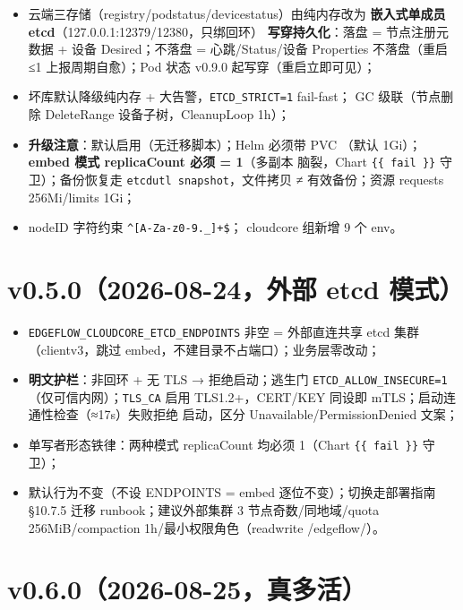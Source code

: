 \begin{itemize}
  \item 云端三存储（registry/podstatus/devicestatus）由纯内存改为
        \textbf{嵌入式单成员 etcd}（127.0.0.1:12379/12380，只绑回环）
        \textbf{写穿持久化}：落盘 = 节点注册元数据 + 设备 Desired；不落盘 =
        心跳/Status/设备 Properties 不落盘（重启 ≤1 上报周期自愈）；Pod 状态 v0.9.0 起写穿（重启立即可见）；
  \item 坏库默认降级纯内存 + 大告警，\texttt{ETCD\_STRICT=1} fail-fast；
        GC 级联（节点删除 DeleteRange 设备子树，CleanupLoop 1h）；
  \item \textbf{升级注意}：默认启用（无迁移脚本）；Helm 必须带 PVC
        （默认 1Gi）；\textbf{embed 模式 replicaCount 必须 = 1}（多副本
        脑裂，Chart \texttt{\{\{ fail \}\}} 守卫）；备份恢复走
        \texttt{etcdutl snapshot}，文件拷贝 ≠ 有效备份；资源 requests
        256Mi/limits 1Gi；
  \item nodeID 字符约束 \texttt{\textasciicircum{}[A-Za-z0-9.\_\-]+\$}；
        cloudcore 组新增 9 个 env。
\end{itemize}

\section{v0.5.0（2026-08-24，外部 etcd 模式）}

\begin{itemize}
  \item \texttt{EDGEFLOW\_CLOUDCORE\_ETCD\_ENDPOINTS} 非空 = 外部直连共享
        etcd 集群（clientv3，跳过 embed，不建目录不占端口）；业务层零改动；
  \item \textbf{明文护栏}：非回环 + 无 TLS → 拒绝启动；逃生门
        \texttt{ETCD\_ALLOW\_INSECURE=1}（仅可信内网）；\texttt{TLS\_CA} 启用
        TLS1.2+，CERT/KEY 同设即 mTLS；启动连通性检查（≈17s）失败拒绝
        启动，区分 Unavailable/PermissionDenied 文案；
  \item 单写者形态铁律：两种模式 replicaCount 均必须 1（Chart
        \texttt{\{\{ fail \}\}} 守卫）；
  \item 默认行为不变（不设 ENDPOINTS = embed 逐位不变）；切换走部署指南
        §10.7.5 迁移 runbook；建议外部集群 3 节点奇数/同地域/quota
        256MiB/compaction 1h/最小权限角色（readwrite /edgeflow/）。
\end{itemize}

\section{v0.6.0（2026-08-25，真多活）}

